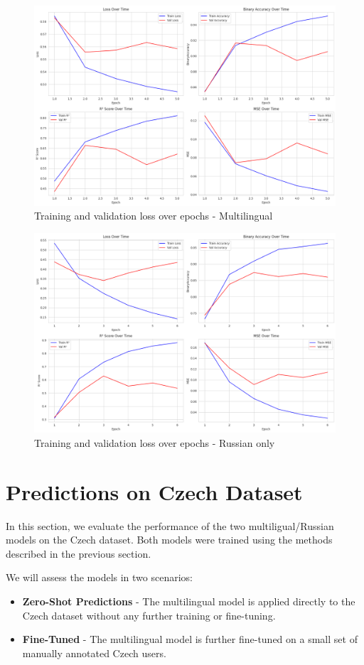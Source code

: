 \documentclass[twoside]{ctuthesis}
\theoremstyle{plain}
\theoremstyle{definition}
\theoremstyle{note}
\begin{document}
\begin{figure}[htbp]
	\centering
	\includegraphics[scale=0.33]{figures/training_full.png}
	\caption{Training and validation loss over epochs - Multilingual}
	\label{fig:training_stats}
\end{figure}

\begin{figure}[htbp]
	\centering
	\includegraphics[scale=0.33]{figures/russian_training.png}
	\caption{Training and validation loss over epochs - Russian only}
	\label{fig:training_stats_russian}
\end{figure}

\section{Predictions on Czech Dataset}
In this section, we evaluate the performance of the two multiligual/Russian models on the Czech dataset. Both models were trained using the methods described in the previous section.\par
We will assess the models in two scenarios:
\begin{itemize}
	\item \textbf{Zero-Shot Predictions} - The multilingual model is applied directly to the Czech dataset without any further training or fine-tuning.
	\item \textbf{Fine-Tuned} - The multilingual model is further fine-tuned on a small set of manually annotated Czech users.
\end{itemize}
\end{document}

